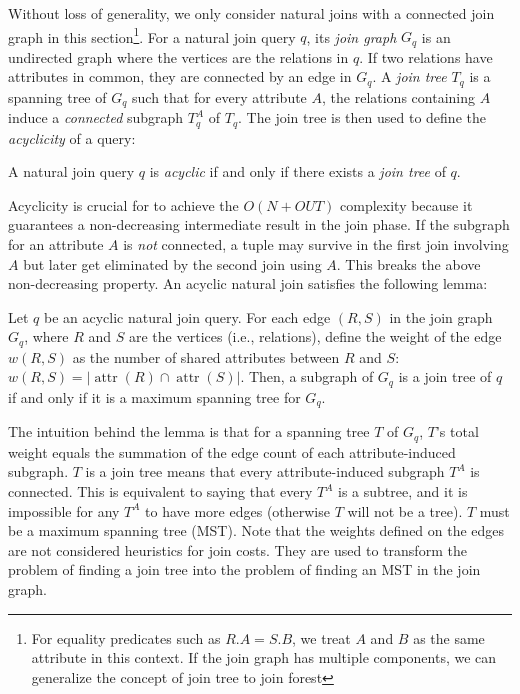 Without loss of generality, we only consider natural joins with a connected join graph in this section\footnote{For equality predicates such as $R.A = S.B$, we treat $A$ and $B$ as the same attribute in this context. If the join graph has multiple components, we can generalize the concept of join tree to join forest}. For a natural join query $q$, its \emph{join graph} $G_q$ is an undirected graph where the vertices are the relations in $q$. If two relations have attributes in common, they are connected by an edge in $G_q$. A \emph{join tree} $T_q$ is a spanning tree of $G_q$ such that for every attribute $A$, the relations containing $A$ induce a \emph{connected} subgraph $T^A_q$ of $T_q$. The join tree is then used to define the \emph{acyclicity} of a query:

\begin{definition}\label{def:acyclic}
A natural join query $q$ is {\em acyclic} if and only if there exists a \emph{join tree} of $q$.
\end{definition}

Acyclicity is crucial for \YannAlg to achieve the $O(N + OUT)$ complexity because it guarantees a non-decreasing intermediate result in the join phase. If the subgraph for an attribute $A$ is \emph{not} connected, a tuple may survive in the first join involving $A$ but later get eliminated by the second join using $A$. This breaks the above non-decreasing property. An acyclic natural join satisfies the following lemma:

\begin{lemma}\label{thm:mst}
Let $q$ be an acyclic natural join query. For each edge $(R,S)$ in the join graph $G_q$, where $R$ and $S$ are the vertices (i.e., relations), define the weight of the edge $w(R,S)$ as the number of shared attributes between $R$ and $S$: $w(R,S)=\left|\operatorname{attr}(R)\cap\operatorname{attr}(S)\right|$. 
Then, a subgraph of $G_q$ is a join tree of $q$ if and only if it is a maximum spanning tree for $G_q$.
\end{lemma}

The intuition behind the lemma is that for a spanning tree $T$ of $G_q$, $T$'s total weight equals the summation of the edge count of each attribute-induced subgraph. $T$ is a join tree means that every attribute-induced subgraph $T^A$ is connected. This is equivalent to saying that every $T^A$ is a subtree, and it is impossible for any $T^A$ to have more edges (otherwise $T$ will not be a tree). $T$ must be a maximum spanning tree (MST). Note that the weights defined on the edges are not considered heuristics for join costs. They are used to transform the problem of finding a join tree into the problem of finding an MST in the join graph.

